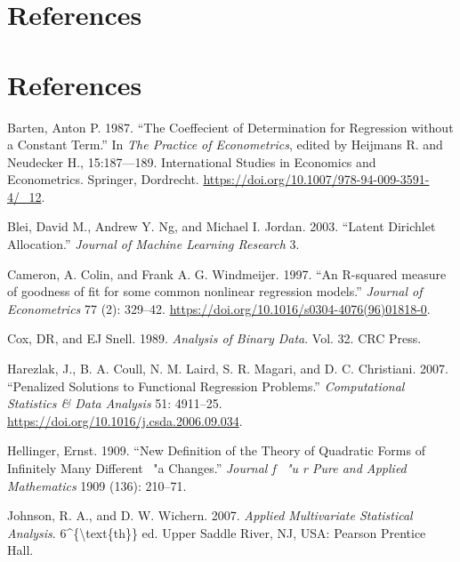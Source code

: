 \hypertarget{references}{%
\section{References}\label{references}}

\hypertarget{references-1}{%
\section*{References}\label{references-1}}

\hypertarget{refs}{}
\begin{CSLReferences}{1}{0}
\leavevmode{}%
Barten, Anton P. 1987. {``{The Coeffecient of Determination for Regression without a Constant Term}.''} In \emph{The Practice of Econometrics}, edited by Heijmans R. and Neudecker H., 15:187---189. International Studies in Economics and Econometrics. Springer, Dordrecht. \url{https://doi.org/10.1007/978-94-009-3591-4/_12}.

\leavevmode{}%
Blei, David M., Andrew Y. Ng, and Michael I. Jordan. 2003. {``{Latent Dirichlet Allocation}.''} \emph{Journal of Machine Learning Research} 3.

\leavevmode{}%
Cameron, A. Colin, and Frank A. G. Windmeijer. 1997. {``{An R-squared measure of goodness of fit for some common nonlinear regression models}.''} \emph{Journal of Econometrics} 77 (2): 329--42. \url{https://doi.org/10.1016/s0304-4076(96)01818-0}.

\leavevmode{}%
Cox, DR, and EJ Snell. 1989. \emph{Analysis of Binary Data}. Vol. 32. CRC Press.

\leavevmode{}%
Harezlak, J., B. A. Coull, N. M. Laird, S. R. Magari, and D. C. Christiani. 2007. {``Penalized Solutions to Functional Regression Problems.''} \emph{Computational Statistics \& Data Analysis} 51: 4911--25. \url{https://doi.org/10.1016/j.csda.2006.09.034}.

\leavevmode{}%
Hellinger, Ernst. 1909. {``New Definition of the Theory of Quadratic Forms of Infinitely Many Different {~"a} Changes.''} \emph{Journal f {~"u} r Pure and Applied Mathematics} 1909 (136): 210--71.

\leavevmode{}%
Johnson, R. A., and D. W. Wichern. 2007. \emph{Applied Multivariate Statistical Analysis}. 6\^{}\{\textbackslash text\{th\}\} ed. Upper Saddle River, NJ, USA: Pearson Prentice Hall.


\end{CSLReferences}
